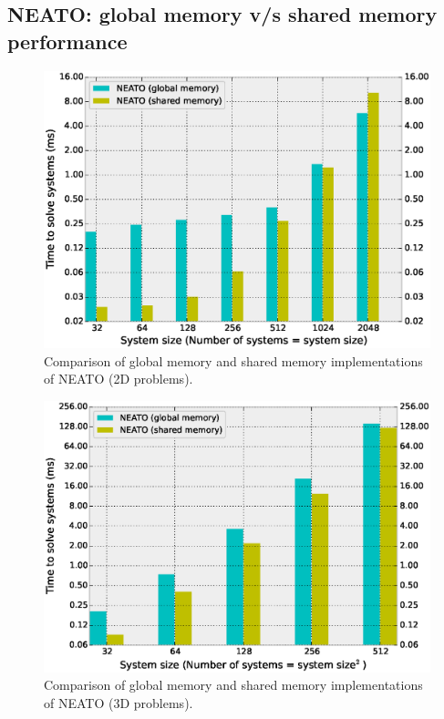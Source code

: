 \documentclass{elsarticle}
\begin{document}
\subsection{NEATO: global memory v/s shared memory performance}

\begin{figure}
\begin{center}
\includegraphics[width=1.0\linewidth]{fig/global-vs-shared-2d.eps}
\caption{Comparison of global memory and shared
    memory implementations of NEATO (2D problems).}
\label{fig:global-vs-shared-2d}
\end{center}
\end{figure}

\begin{figure}
\begin{center}
\includegraphics[width=1.0\linewidth]{fig/global-vs-shared-3d.eps}
\caption{Comparison of global memory and shared memory
    implementations of NEATO (3D problems).}
\label{fig:global-vs-shared-3d}
\end{center}
\end{figure}
\end{document}
